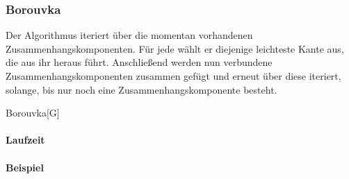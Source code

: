 \subsubsection{Borouvka}
\label{subsubsec:Borouvka}
Der Algorithmus iteriert über die momentan vorhandenen Zusammenhangskomponenten.
Für jede wählt er diejenige leichteste Kante aus, die aus ihr heraus führt.
Anschließend werden nun verbundene Zusammenhangskomponenten zusammen gefügt und erneut über diese iteriert,
solange, bis nur noch eine Zusammenhangskomponente besteht.

\begin{algorithm}{Borouvka}[G]{
	\qinput{}
	\qoutput{}
}
\end{algorithm}

\paragraph{Laufzeit}

\paragraph{Beispiel}
